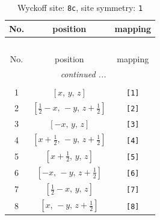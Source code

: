 \documentclass[fleqn,8pt]{jsarticle}
\begin{document}
\renewcommand{\arraystretch}{1.2}
\begin{longtable}{ccc}
\caption{Wyckoff site: {\tt 8c}, site symmetry: {\tt 1}}
 \\
 \hline \hline
No. & position & mapping \\ \hline \endfirsthead

\multicolumn{2}{l}{\tablename\ \thetable{}} \\
 \hline \hline
No. & position & mapping \\ \hline \endhead

 \hline \hline
\multicolumn{2}{r}{\footnotesize\it continued ...} \\ \endfoot

 \hline \hline
\multicolumn{2}{r}{} \\ \endlastfoot

1 & $\left[ x,\, y,\, z \right]$ & {\tt [1]} \\ \hline
2 & $\left[ \frac{1}{2} - x,\, - y,\, z + \frac{1}{2} \right]$ & {\tt [2]} \\ \hline
3 & $\left[ - x,\, y,\, z \right]$ & {\tt [3]} \\ \hline
4 & $\left[ x + \frac{1}{2},\, - y,\, z + \frac{1}{2} \right]$ & {\tt [4]} \\ \hline
5 & $\left[ x + \frac{1}{2},\, y,\, z \right]$ & {\tt [5]} \\ \hline
6 & $\left[ - x,\, - y,\, z + \frac{1}{2} \right]$ & {\tt [6]} \\ \hline
7 & $\left[ \frac{1}{2} - x,\, y,\, z \right]$ & {\tt [7]} \\ \hline
8 & $\left[ x,\, - y,\, z + \frac{1}{2} \right]$ & {\tt [8]} \\
\end{longtable}
\end{document}
